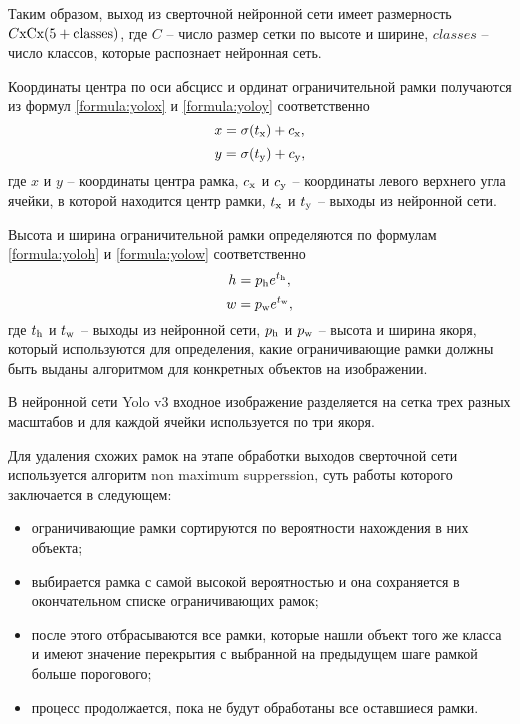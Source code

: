 Таким образом, выход из сверточной нейронной сети имеет размерность $C\rm{x}C\rm{x}(5+classes)$, где $C$ -- число размер сетки по высоте и ширине, $classes$ -- число классов, которые распознает нейронная сеть.

Координаты центра по оси абсцисс и ординат ограничительной рамки получаются из формул \ref{formula:yolox} и \ref{formula:yoloy} соответственно
\begin{equation}\label{formula:yolox}
x = \sigma(t_{\rm{x}}) + c_{\rm{x}},
\end{equation}
\begin{equation}\label{formula:yoloy}
y = \sigma(t_{\rm{y}}) + c_{\rm{y}},
\end{equation}
где $x$ и $y$ -- координаты центра рамка, $c_{\rm{x}}$ и $c_{\rm{y}}$ -- координаты левого верхнего угла ячейки, в которой находится центр рамки, $t_{\rm{x}}$ и $t_{\rm{y}}$ -- выходы из нейронной сети.

Высота и ширина ограничительной рамки определяются по формулам \ref{formula:yoloh} и \ref{formula:yolow} соответственно
\begin{equation}\label{formula:yoloh}
h =  p_{\rm{h}}e^{t_{\rm{h}}},
\end{equation}
\begin{equation}\label{formula:yolow}
w =  p_{\rm{w}}e^{t_{\rm{w}}},
\end{equation}
где $t_{\rm{h}}$ и $t_{\rm{w}}$ -- выходы из нейронной сети, $p_{\rm{h}}$ и $p_{\rm{w}}$ -- высота и ширина якоря, который используются для определения, какие ограничивающие рамки должны быть выданы алгоритмом для конкретных объектов на изображении.

В нейронной сети Yolo v3 входное изображение разделяется на сетка трех разных масштабов и для каждой ячейки используется по три якоря.

Для удаления схожих рамок на этапе обработки выходов сверточной сети используется алгоритм non maximum supperssion, суть работы которого заключается в следующем:
\begin{itemize}
	\item ограничивающие рамки сортируются по вероятности нахождения в них объекта;
	\item выбирается рамка с самой высокой вероятностью и она сохраняется в окончательном списке ограничивающих рамок;
	\item после этого отбрасываются все рамки, которые нашли объект того же класса и имеют значение перекрытия с выбранной на предыдущем шаге рамкой больше порогового;
	\item процесс продолжается, пока не будут обработаны все оставшиеся рамки.
\end{itemize}

